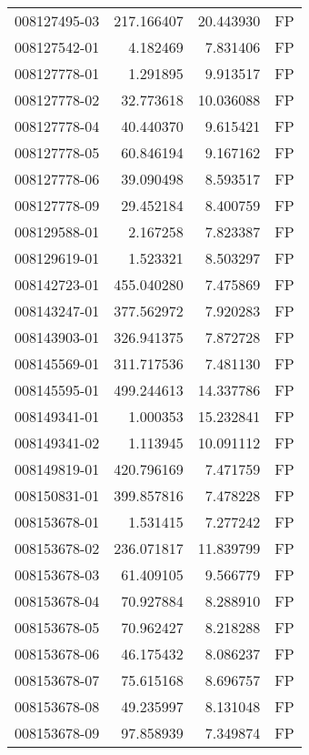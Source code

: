 \begin{tabular}{lrrl}
008127495-03 &  217.166407 &      20.443930 &   FP \\
008127542-01 &    4.182469 &       7.831406 &   FP \\
008127778-01 &    1.291895 &       9.913517 &   FP \\
008127778-02 &   32.773618 &      10.036088 &   FP \\
008127778-04 &   40.440370 &       9.615421 &   FP \\
008127778-05 &   60.846194 &       9.167162 &   FP \\
008127778-06 &   39.090498 &       8.593517 &   FP \\
008127778-09 &   29.452184 &       8.400759 &   FP \\
008129588-01 &    2.167258 &       7.823387 &   FP \\
008129619-01 &    1.523321 &       8.503297 &   FP \\
008142723-01 &  455.040280 &       7.475869 &   FP \\
008143247-01 &  377.562972 &       7.920283 &   FP \\
008143903-01 &  326.941375 &       7.872728 &   FP \\
008145569-01 &  311.717536 &       7.481130 &   FP \\
008145595-01 &  499.244613 &      14.337786 &   FP \\
008149341-01 &    1.000353 &      15.232841 &   FP \\
008149341-02 &    1.113945 &      10.091112 &   FP \\
008149819-01 &  420.796169 &       7.471759 &   FP \\
008150831-01 &  399.857816 &       7.478228 &   FP \\
008153678-01 &    1.531415 &       7.277242 &   FP \\
008153678-02 &  236.071817 &      11.839799 &   FP \\
008153678-03 &   61.409105 &       9.566779 &   FP \\
008153678-04 &   70.927884 &       8.288910 &   FP \\
008153678-05 &   70.962427 &       8.218288 &   FP \\
008153678-06 &   46.175432 &       8.086237 &   FP \\
008153678-07 &   75.615168 &       8.696757 &   FP \\
008153678-08 &   49.235997 &       8.131048 &   FP \\
008153678-09 &   97.858939 &       7.349874 &   FP \\

\end{tabular}
